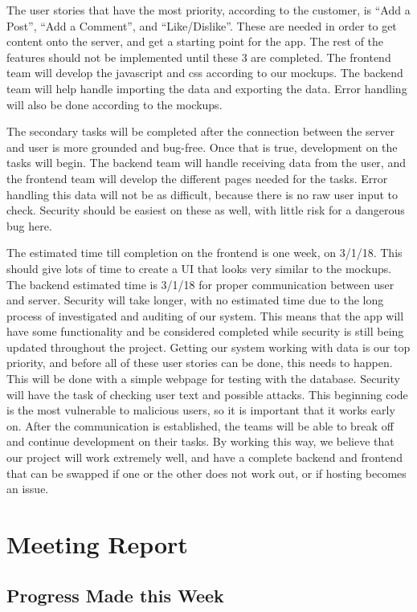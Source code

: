 \documentclass[12pt]{article}
\begin{document}
The user stories that have the most priority, according to the customer, is “Add
a Post”, “Add a Comment”, and  “Like/Dislike”. These are needed in order to get
content onto the server, and get a starting point for the app. The rest of the
features should not be implemented until these 3 are completed. The frontend
team will develop the javascript and css according to our mockups. The backend
team will help handle importing the data and exporting the data. Error handling
will also be done according to the mockups.

The secondary tasks will be completed after the connection between the server
and user is more grounded and bug-free. Once that is true, development on the
tasks will begin. The backend team will handle receiving data from the user, and
the frontend team will develop the different pages needed for the tasks. Error
handling this data will not be as difficult, because there is no raw user input
to check. Security should be easiest on these as well, with little risk for a
dangerous bug here.

The estimated time till completion on the frontend is one week, on 3/1/18. This
should give lots of time to create a UI that looks very similar to the mockups.
The backend estimated time is 3/1/18 for proper communication between user and
server. Security will take longer, with no estimated time due to the long
process of investigated and auditing of our system. This means that the app will
have some functionality and be considered completed while security is still
being updated throughout the project. Getting our system working with data is
our top priority, and before all of these user stories can be done, this needs
to happen. This will be done with a simple webpage for testing with the
database. Security will have the task of checking user text and possible
attacks. This beginning code is the most vulnerable to malicious users, so it is
important that it works early on. After the communication is established, the
teams will be able to break off and continue development on their tasks. By
working this way, we believe that our project will work extremely well, and have
a complete backend and frontend that can be swapped if one or the other does not
work out, or if hosting becomes an issue.

\section{Meeting Report}

\subsection{Progress Made this Week}
\end{document}

